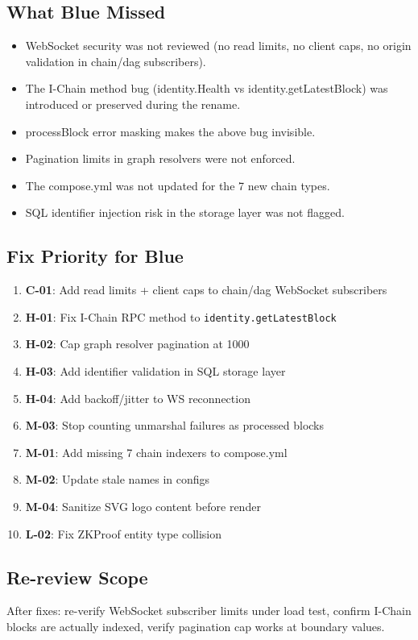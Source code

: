 \documentclass{article}
\begin{document}
\subsection*{What Blue Missed}
\begin{itemize}
  \item WebSocket security was not reviewed (no read limits, no client caps,
        no origin validation in chain/dag subscribers).
  \item The I-Chain method bug (identity.Health vs identity.getLatestBlock)
        was introduced or preserved during the rename.
  \item processBlock error masking makes the above bug invisible.
  \item Pagination limits in graph resolvers were not enforced.
  \item The compose.yml was not updated for the 7 new chain types.
  \item SQL identifier injection risk in the storage layer was not flagged.
\end{itemize}

\subsection*{Fix Priority for Blue}
\begin{enumerate}
  \item \textbf{C-01}: Add read limits + client caps to chain/dag WebSocket subscribers
  \item \textbf{H-01}: Fix I-Chain RPC method to \texttt{identity.getLatestBlock}
  \item \textbf{H-02}: Cap graph resolver pagination at 1000
  \item \textbf{H-03}: Add identifier validation in SQL storage layer
  \item \textbf{H-04}: Add backoff/jitter to WS reconnection
  \item \textbf{M-03}: Stop counting unmarshal failures as processed blocks
  \item \textbf{M-01}: Add missing 7 chain indexers to compose.yml
  \item \textbf{M-02}: Update stale names in configs
  \item \textbf{M-04}: Sanitize SVG logo content before render
  \item \textbf{L-02}: Fix ZKProof entity type collision
\end{enumerate}

\subsection*{Re-review Scope}
After fixes: re-verify WebSocket subscriber limits under load test,
confirm I-Chain blocks are actually indexed, verify pagination cap
works at boundary values.
\end{document}
